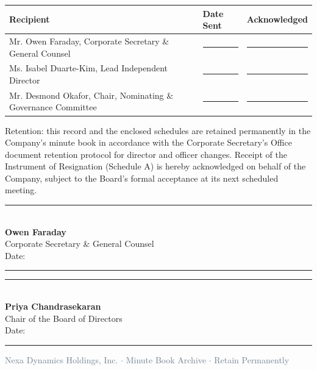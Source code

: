 \documentclass[english,11pt]{g-brief}
\begin{document}
\vspace{6mm}
\begin{tcolorbox}[
    colback=white,
    colframe=BrassGold,
    boxrule=0.8pt,
    arc=1.5mm,
    top=3mm,
    bottom=3mm,
    left=4mm,
    right=4mm,
    title=\textcolor{white}{\small\faCalendar\ \textbf{Distribution Confirmation Log}}
]
\small
\begin{tabularx}{\textwidth}{@{}X l l@{}}
\toprule
\textbf{Recipient} & \textbf{Date Sent} & \textbf{Acknowledged} \\
\midrule
Mr. Owen Faraday, Corporate Secretary \& General Counsel & \rule{2cm}{0.4pt} & \rule{1.4cm}{0.4pt} \\{}
Ms. Isabel Duarte-Kim, Lead Independent Director & \rule{2cm}{0.4pt} & \rule{1.4cm}{0.4pt} \\{}
Mr. Desmond Okafor, Chair, Nominating \& Governance Committee & \rule{2cm}{0.4pt} & \rule{1.4cm}{0.4pt} \\
\bottomrule
\end{tabularx}
\end{tcolorbox}

\vspace{6mm}
\textcolor{DarkText}{Retention: this record and the enclosed schedules are retained permanently in the Company's minute book in accordance with the Corporate Secretary's Office document retention protocol for director and officer changes. Receipt of the Instrument of Resignation (Schedule A) is hereby acknowledged on behalf of the Company, subject to the Board's formal acceptance at its next scheduled meeting.}

\vspace{10mm}
\noindent
\begin{minipage}[t]{0.46\textwidth}
\textcolor{SlateGray}{\rule{\linewidth}{0.5pt}}\\[1mm]
\textbf{Owen Faraday}\\
Corporate Secretary \& General Counsel\\
Date: \rule{2.6cm}{0.4pt}
\end{minipage}\hfill
\begin{minipage}[t]{0.46\textwidth}
\textcolor{SlateGray}{\rule{\linewidth}{0.5pt}}\\[1mm]
\textbf{Priya Chandrasekaran}\\
Chair of the Board of Directors\\
Date: \rule{2.6cm}{0.4pt}
\end{minipage}
\par

\vspace{6mm}
\begin{center}
\small\textcolor{SlateGray}{Nexa Dynamics Holdings, Inc. $\cdot$ Minute Book Archive $\cdot$ Retain Permanently}
\end{center}
\end{document}

